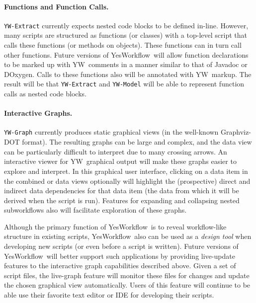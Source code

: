 \documentclass{article}
\newcommand{\YW}{\textsf{YesWorkflow}}
\newcommand{\yw}{\textsf{YW}}
\newcommand{\ywm}[1]{\texttt{#1}}
\begin{document}
\paragraph{Functions and Function Calls.}
\ywm{YW-Extract} currently expects nested code blocks to be defined
in-line. However, many scripts are structured as functions (or
classes) with a top-level script that calls these functions (or
methods on objects). These functions can in turn call other functions.
%
Future versions of \YW\ will allow function declarations to be marked
up with \yw\ comments in a manner similar to that of Javadoc or
DOxygen. Calls to these functions also will be annotated with \yw\
markup. The result will be that \ywm{YW-Extract} and \ywm{YW-Model}
will be able to represent function calls as nested code blocks.

\paragraph{Interactive Graphs.}
\ywm{YW-Graph} currently produces static graphical views (in the
well-known Graphviz-DOT format). The resulting graphs can be large and
complex, and the data view can be particularly difficult to interpret
due to many crossing arrows. An interactive viewer for \yw\ graphical
output will make these graphs easier to explore and interpret. In this
graphical user interface, clicking on a data item in the combined or
data views optionally will highlight the (prospective) direct and
indirect data dependencies for that data item (the data from which it
will be derived when the script is run).  Features for expanding and
collapsing nested subworkflows also will facilitate exploration of
these graphs.

Although the primary function of \YW\ is to reveal workflow-like
structure in existing scripts, \YW\ also can be used as a \emph{design
  tool} when developing new scripts (or even before a script is
written). Future versions of \YW\ will better support such
applications by providing live-update features to the interactive
graph capabilities described above. Given a set of script files, the
live-graph feature will monitor these files for changes and update the
chosen graphical view automatically. Users of this feature will
continue to be able use their favorite text editor or IDE for
developing their scripts.
\end{document}
